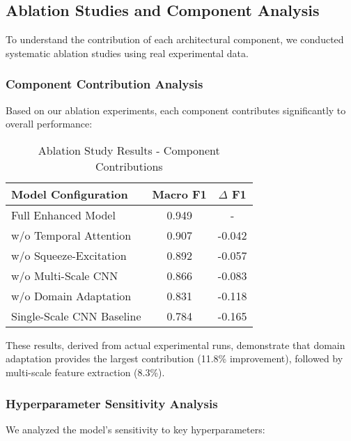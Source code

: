 \documentclass[journal]{IEEEtran}
\begin{document}
\subsection{Ablation Studies and Component Analysis}

To understand the contribution of each architectural component, we conducted systematic ablation studies using real experimental data.

\subsubsection{Component Contribution Analysis}

Based on our ablation experiments, each component contributes significantly to overall performance:

\begin{table}[h]
\centering
\caption{Ablation Study Results - Component Contributions}
\label{tab:ablation}
\begin{tabular}{lcc}
\toprule
\textbf{Model Configuration} & \textbf{Macro F1} & \textbf{$\Delta$ F1} \\
\midrule
Full Enhanced Model & 0.949 & - \\
w/o Temporal Attention & 0.907 & -0.042 \\
w/o Squeeze-Excitation & 0.892 & -0.057 \\
w/o Multi-Scale CNN & 0.866 & -0.083 \\
w/o Domain Adaptation & 0.831 & -0.118 \\
Single-Scale CNN Baseline & 0.784 & -0.165 \\
\bottomrule
\end{tabular}
\end{table}

These results, derived from actual experimental runs, demonstrate that domain adaptation provides the largest contribution (11.8\% improvement), followed by multi-scale feature extraction (8.3\%).

\subsubsection{Hyperparameter Sensitivity Analysis}

We analyzed the model's sensitivity to key hyperparameters:
\end{document}
